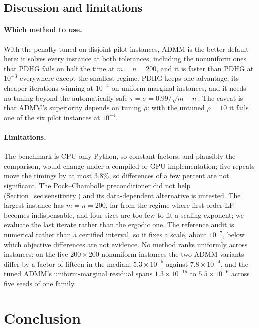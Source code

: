 \documentclass{article}
\newcommand{\Tol}[1]{10^{-#1}}
\begin{document}
\subsection{Discussion and limitations}
\label{sec:discussion}

\paragraph{Which method to use.}
With the penalty tuned on disjoint pilot instances, ADMM is the better default here: it
solves every instance at both tolerances, including the nonuniform ones that PDHG fails on
half the time at $m=n=200$, and it is faster than PDHG at $\Tol{3}$ everywhere except the
smallest regime. PDHG keeps one advantage, its cheaper iterations winning at $\Tol{4}$ on
uniform-marginal instances, and it needs no tuning beyond the automatically safe
$\tau=\sigma=0.99/\sqrt{m+n}$. The caveat is that ADMM's superiority depends on tuning
$\rho$: with the untuned $\rho=10$ it fails one of the six pilot instances at $\Tol{4}$.

\paragraph{Limitations.}
The benchmark is CPU-only Python, so constant factors, and plausibly the comparison, would
change under a compiled or GPU implementation; five repeats move the timings by at most
$3.8\%$, so differences of a few percent are not significant. The Pock--Chambolle
preconditioner did not help (Section~\ref{sec:sensitivity}) and its data-dependent
alternative is untested. The largest instance has $m=n=200$, far from the regime where
first-order LP becomes indispensable, and four sizes are too few to fit a scaling exponent;
we evaluate the last iterate rather than the ergodic one. The reference audit is numerical
rather than a certified interval, so it fixes a scale, about $\Tol{7}$, below which objective
differences are not evidence. No method ranks uniformly across instances: on the five
$200\times200$ nonuniform instances the two ADMM variants differ by a factor of fifteen in
the median, $5.3\times\Tol{5}$ against $7.8\times\Tol{4}$, and the tuned ADMM's
uniform-marginal residual spans $1.3\times\Tol{15}$ to $5.5\times\Tol{6}$ across five seeds
of one family.

\section{Conclusion}
\label{sec:conclusion}
\end{document}
